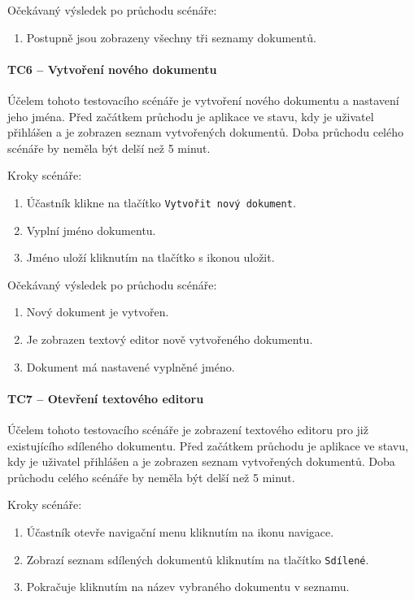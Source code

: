 Očekávaný výsledek po průchodu scénáře:
\begin{enumerate}
    \item Postupně jsou zobrazeny všechny tři seznamy dokumentů.
\end{enumerate}


\paragraph{TC6 -- Vytvoření nového dokumentu}

Účelem tohoto testovacího scénáře je vytvoření nového dokumentu a nastavení jeho jména.
Před začátkem průchodu je aplikace ve stavu, kdy je uživatel přihlášen a je zobrazen seznam vytvořených dokumentů.
Doba průchodu celého scénáře by neměla být delší než 5 minut.

Kroky scénáře:
\begin{enumerate}
    \item Účastník klikne na tlačítko \texttt{Vytvořit nový dokument}.
    \item Vyplní jméno dokumentu.
    \item Jméno uloží kliknutím na tlačítko s ikonou uložit.
\end{enumerate}

Očekávaný výsledek po průchodu scénáře:
\begin{enumerate}
    \item Nový dokument je vytvořen.
    \item Je zobrazen textový editor nově vytvořeného dokumentu.
    \item Dokument má nastavené vyplněné jméno.
\end{enumerate}

\paragraph{TC7 -- Otevření textového editoru}

Účelem tohoto testovacího scénáře je zobrazení textového editoru pro již existujícího sdíleného dokumentu.
Před začátkem průchodu je aplikace ve stavu, kdy je uživatel přihlášen a je zobrazen seznam vytvořených dokumentů.
Doba průchodu celého scénáře by neměla být delší než 5 minut.

Kroky scénáře:
\begin{enumerate}
    \item Účastník otevře navigační menu kliknutím na ikonu navigace.
    \item Zobrazí seznam sdílených dokumentů kliknutím na tlačítko \texttt{Sdílené}.
    \item Pokračuje kliknutím na název vybraného dokumentu v seznamu.
\end{enumerate}

